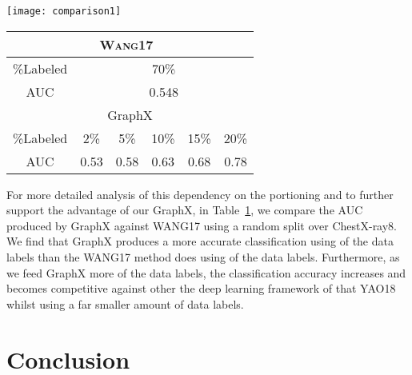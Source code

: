 \documentclass[runningheads]{llncs}
\begin{document}
\begin{table}[t!]
	\begin{minipage}{0.59\linewidth}
		\centering
		\texttt{[image: comparison1]}
\label{}
	\end{minipage}
		\begin{minipage}{0.40\linewidth}
		\label{table:student}
		\centering
		\begin{tabular}{|c|c|c|c|c|c|}
            \hline
            \multicolumn{6}{|c|}{\cellcolor[HTML]{EFEFEF}\textsc{Wang17}~\cite{wang2017chestx}} \\ \hline
            \%Labeled             & \multicolumn{5}{c|}{70\%}                  \\ \hline
            AUC           & \multicolumn{5}{c|}{0.548}                \\ \hline \hline
            \multicolumn{6}{|c|}{\cellcolor[HTML]{EFEFEF}GraphX}   \\ \hline
            \%Labeled              & 2\%   &  5\%      & 10\%   &  15\%     &   20\%     \\ \hline
            AUC     & 0.53     & 0.58     & 0.63     & 0.68    & 0.78    \\ \hline
        \end{tabular}
	\end{minipage}
\end{table}

For more detailed analysis of this dependency on the portioning and to further support the advantage of our GraphX, in Table~\ref{table:student}, we compare the AUC produced by GraphX against WANG17 using a random split over ChestX-ray8. We find that GraphX produces a more accurate classification using  of the data labels than the WANG17 method does using  of the data labels. Furthermore, as we feed GraphX more of the data labels, the classification accuracy increases and becomes competitive against other the deep learning framework of that YAO18~\cite{yao2018weakly} whilst using a far smaller amount of data labels.


\section{Conclusion}
\end{document}
